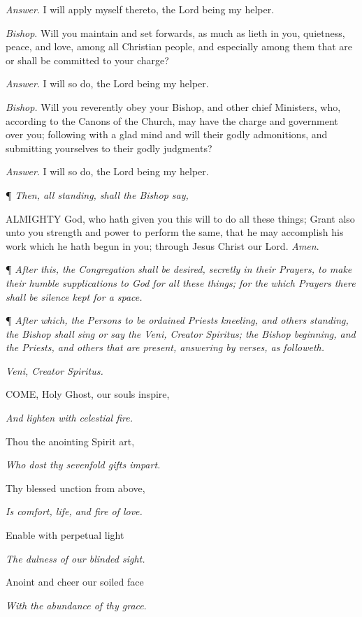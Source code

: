\emph{Answer}. I will apply myself thereto,
the Lord being my helper.

\emph{Bishop}. Will you maintain and set forwards,
as much as lieth in you, quietness, peace, and love, among all Christian
people, and especially among them that are or shall be committed to your
charge?

\emph{Answer}. I will so do, the Lord being my helper.

\emph{Bishop.} Will you reverently obey your
Bishop, and other chief Ministers, who, according to the Canons of the
Church, may have the charge and government over you; following with a
glad mind and will their godly admonitions, and submitting yourselves
to their godly judgments?

\emph{Answer}. I will so do, the Lord being my helper.

¶ \emph{Then, all standing, shall the
Bishop say,}

ALMIGHTY God, who hath
given you this will to do all these things; Grant also unto you strength
and power to perform the same, that he may accomplish his work which he
hath begun in you; through Jesus Christ our Lord. \emph{Amen}.

¶ \emph{After this, the
Congregation shall be desired, secretly in their Prayers, to make their
humble supplications to God for all these things; for the which Prayers
there shall be silence kept for a space.}

¶ \emph{After which,
the Persons to be ordained Priests kneeling, and others standing, the
Bishop shall sing or say the Veni, Creator Spiritus; the Bishop beginning,
and the Priests, and others that are present, answering by verses, as
followeth.}

\emph{Veni,
Creator Spiritus.}

COME,
Holy Ghost, our souls inspire, 

\emph{And lighten with celestial fire.} 

Thou the anointing Spirit art, 

\emph{Who dost thy sevenfold gifts impart.}

Thy
blessed unction from above, 

\emph{Is comfort, life, and fire of love.}

Enable with perpetual light 

\emph{The dulness of our blinded sight.}

Anoint
and cheer our soiled face 

\emph{With the abundance of thy grace}. 

